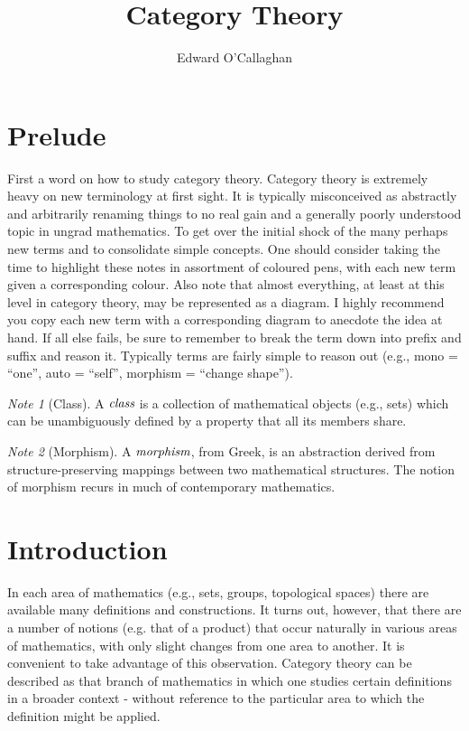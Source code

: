 \documentclass[10pt, oneside, reqno]{amsart}
\title{Category Theory}                               %
\author{Edward O'Callaghan}
\theoremstyle{plain}%
\theoremstyle{definition}
\theoremstyle{remark}
\newtheorem*{note}{Note}
\begin{document}
\maketitle \tableofcontents \clearpage

\section{Prelude} %
\label{sec:purelude}
First a word on how to study category theory. Category theory is extremely heavy on new terminology at first sight.
It is typically misconceived as abstractly and arbitrarily renaming things to no real gain and a generally poorly understood
topic in ungrad mathematics. To get over the initial shock of the many perhaps new terms and to consolidate simple concepts.
One should consider taking the time to highlight these notes in assortment of coloured pens,
with each new term given a corresponding colour. Also note that almost everything, at least
at this level in category theory, may be represented as a diagram. I highly recommend you copy each new term with a corresponding
diagram to anecdote the idea at hand. If all else fails, be sure to remember to break the term down into prefix and suffix and reason
it. Typically terms are fairly simple to reason out (e.g., mono = ``one'', auto = ``self'', morphism = ``change shape'').

\begin{note}[Class]
 A $\emph{class}$ is a collection of mathematical objects (e.g., sets)
 which can be unambiguously defined by a property that all its members share.
\end{note}

\begin{note}[Morphism]
 A $\emph{morphism}$, from Greek, is an abstraction derived from
 structure-preserving mappings between two mathematical structures.
 The notion of morphism recurs in much of contemporary mathematics.
\end{note}

\section{Introduction} %
\label{sec:introduction}
In each area of mathematics (e.g., sets, groups, topological spaces) there are available many definitions
and constructions. It turns out, however, that there are a number of notions (e.g. that of a product)
that occur naturally in various areas of mathematics, with only slight changes from one area to another.
It is convenient to take advantage of this observation. Category theory can be described as that branch of mathematics
in which one studies certain definitions in a broader context - without reference to the particular area to which
the definition might be applied.
\end{document}
